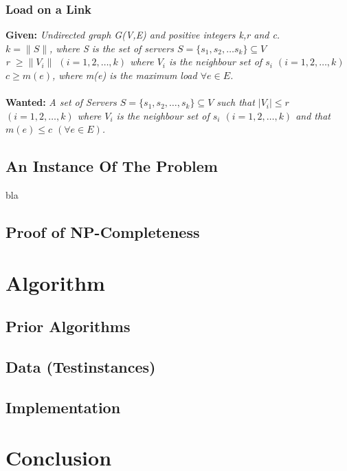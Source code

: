 \documentclass [12pt]{article}
\begin{document}
\subsubsection{Load on a Link}
\textbf{Given:}
{\itshape Undirected graph G(V,E) and  positive integers k,r and c. \\
$k = \|S\|$, where S is the set of servers $S = \{s_1,s_2,\dots s_k\} \subseteq V$\\
r $\geq  \|V_i\|$ $(i=1,2,\dots,k)$ where $V_i$ is the neighbour set of $s_i$ $(i=1,2,\dots,k)$\\
$c \geq m(e)$, where m(e) is the maximum load $\forall e \in E$.} \\
\\
\textbf{Wanted:} 
{\itshape A set of Servers $S = \{s_1, s_2,\dots, s_k \} \subseteq V$ such that $|V_i|\leq r$
    $(i = 1,2, \dots,k)$ where $V_i$ is the neighbour set of $s_i$  $(i = 1,2,\dots,k)$ and that
$m(e) \leq c$ $(\forall e \in E)$.}

\subsection{An Instance Of The Problem}
bla
\subsection{Proof of NP-Completeness}
\section{Algorithm}
    \subsection{Prior Algorithms}
    \subsection{Data (Testinstances)}
    \subsection{Implementation}
\section{Conclusion}



\end{document}
